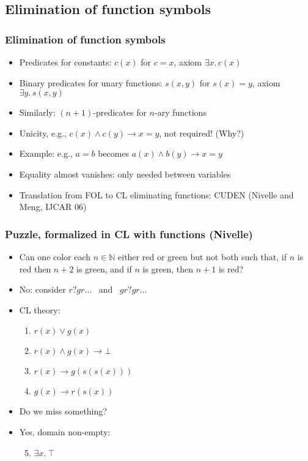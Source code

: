 \documentclass[handout,11pt]{beamer}
\newcommand{\nat}{\mathbb{N}}
\newcommand{\imp}{\rightarrow}
\begin{document}
\subsection{Elimination of function symbols}

\begin{frame}
\frametitle{Elimination of function symbols}
 \begin{itemize}[<+->]
    \item Predicates for constants: $c(x)$ for $c=x$, axiom $\exists x.\,c(x)$
    \item Binary predicates for unary functions: $s(x,y)$ for $s(x)=y$, axiom $\exists y.\,s(x,y)$
    \item Similarly: $(n{+}1)$-predicates for $n$-ary functions
    \item Unicity, e.g., $c(x)\land c(y)\to x=y$, \alert{not} required! (Why?)
    \item Example: e.g., $a=b$ becomes $a(x) \land b(y) \to x=y$
    \item Equality almost vanishes: only needed between variables
    \item Translation from FOL to CL eliminating functions: CUDEN (Nivelle and Meng, IJCAR 06)
 \end{itemize}
\end{frame}

\begin{frame}
\frametitle{Puzzle, formalized in CL with functions (Nivelle)} 
 \begin{itemize}[<+->]
     \item Can one color each
     $n\in\nat$ either red or green but not both such that, if $n$ is red
          then $n{+}2$ is green, and if  $n$ is green, then $n{+}1$ is red?
    \item No: consider $r?gr\ldots$~ and~ $gr?gr\ldots$
    \item CL theory:
    \begin{enumerate}
       \item $r(x) \vee g(x)$ 
       \item $r(x) \wedge g(x) \imp \bot$
       \item $r(x) \imp g(s(s(x)))$ 
       \item $g(x) \imp r(s(x))$
     \end{enumerate}
   \item Do we miss something?
   \item Yes, domain non-empty: 
    \begin{enumerate}       
       \setcounter{enumi}{4}       
       \item $\exists x.~\top$
    \end{enumerate}
 \end{itemize}
\end{frame}
\end{document}
